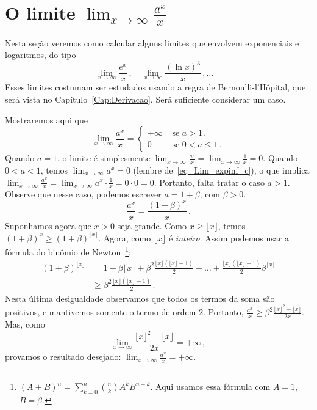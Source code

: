 \section{O limite 
$\lim_{x\to\infty}\frac{a^x}{x}$}\label{sec_Lim_parenteseAldo}
Nesta seção
veremos como calcular alguns limites que envolvem
exponenciais e logaritmos, do tipo 
\[ 
\lim_{x\to\infty}\frac{e^x}{x}\,, \quad
\lim_{x\to\infty}\frac{(\ln x)^3}{x}\,, \dots\quad
\]
Esses limites costumam ser estudados usando a regra de
Bernoulli-l'Hôpital, que será vista no
Capítulo~\ref{Cap:Derivacao}. 
Será suficiente considerar um caso.
\begin{ex}
Mostraremos aqui que
\begin{equation}\label{eq_Lim_ideiaaldo} 
\boxed{
\lim_{x\to\infty}\frac{a^x}{x}=
\begin{cases}
+\infty&\text{ se }a>1\,,\\
0&\text{ se }0<a\leq 1\,.
\end{cases}
}
\end{equation}
Quando $a=1$, o limite é simplesmente
$\lim_{x\to\infty}\frac{a^0}{x}=
\lim_{x\to\infty}\frac{1}{x}=0$.
Quando $0<a<1$, temos $\lim_{x\to\infty}a^x=0$ (lembre
de~\eqref{eq_Lim_expinf_c}), o que implica
$\lim_{x\to\infty}\frac{a^x}{x}=
\lim_{x\to\infty}a^x\cdot\frac{1}{x}=0\cdot 0=0$.
Portanto, falta tratar o caso $a>1$.
Observe que nesse caso, podemos escrever $a=1+\beta$, com
$\beta>0$. 
\[ 
\frac{a^x}{x}=\frac{(1+\beta)^x}{x}\,.
\]
Suponhamos agora que $x>0$ seja grande. 
Como $x\geq \lfloor x \rfloor$, temos $(1+\beta)^x\geq
(1+\beta)^{\lfloor x \rfloor}$.
Agora, como $\lfloor x\rfloor$ é \emph{inteiro}. 
Assim podemos usar a fórmula do binômio de
Newton~\footnote{$(A+B)^n=\sum_{k=0}^n\binom{n}{k}A^kB^{n-k}$. Aqui 
usamos essa fórmula com $A=1$, $B=\beta$.}: 
\begin{align*}
(1+\beta)^{\lfloor x\rfloor}&=1+\beta
{\lfloor x\rfloor}+\beta^2\frac{{\lfloor x\rfloor}({\lfloor x\rfloor}-1)}{2}+\dots+\frac{{\lfloor x\rfloor}({\lfloor x\rfloor}-1)}{2}\beta^{\lfloor x\rfloor}\\
&\geq \beta^2\frac{{\lfloor x\rfloor}({\lfloor x\rfloor}-1)}{2}\,.
\end{align*}
Nesta última desigualdade observamos que 
todos os termos da soma são positivos, 
e mantivemos somente o termo de ordem $2$.
Portanto,
$\frac{a^x}{x} \geq \beta^2\frac{{\lfloor x\rfloor}^2-{\lfloor x\rfloor}}{2{x}}$.
Mas, como
\[ 
\lim_{x\to \infty}\frac{{\lfloor x\rfloor}^2-{\lfloor
x\rfloor}}{2{ x}}=+\infty\,, \]
provamos o resultado desejado:
$\lim_{x\to\infty}\frac{a^x}{x}=+\infty$.
\end{ex}

